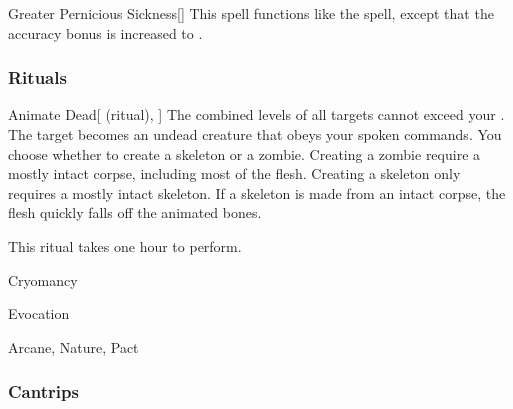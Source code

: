 \lowercase{\hypertarget{spell:Greater Pernicious Sickness}{}}\label{spell:Greater Pernicious Sickness}
\begin{freeability}[\nth{5}]{\hypertarget{spell:Greater Pernicious Sickness}{Greater Pernicious Sickness}}[]
This spell functions like the  spell, except that the accuracy bonus is increased to .
\end{freeability}
\vspace{0.25em}



\subsubsection{Rituals}


\lowercase{\hypertarget{spell:Animate Dead}{}}\label{spell:Animate Dead}
\begin{attuneability}[\nth{2}]{\hypertarget{spell:Animate Dead}{Animate Dead}}[ (ritual), ]
The combined levels of all targets cannot exceed your .
The target becomes an undead creature that obeys your spoken commands.
You choose whether to create a skeleton or a zombie.
Creating a zombie require a mostly intact corpse, including most of the flesh.
Creating a skeleton only requires a mostly intact skeleton.
If a skeleton is made from an intact corpse, the flesh quickly falls off the animated bones.

This ritual takes one hour to perform.
\end{attuneability}
\vspace{0.25em}


\newpage
\begin{spellsection}{Cryomancy}

\begin{spellheader}
\end{spellheader}


 Evocation

 Arcane, Nature, Pact

\subsubsection{Cantrips}


\end{spellsection}


